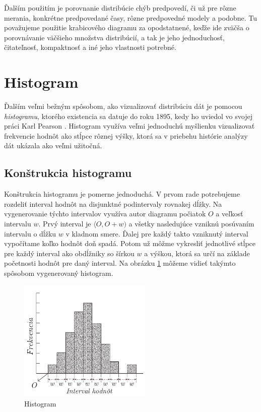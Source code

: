 Ďalším použitím je porovnanie distribúcie chýb predpovedí, či už pre rôzne merania, konkrétne predpovedané časy, rôzne predpovedné modely a podobne. Tu považujeme použitie krabicového diagramu za opodstatnené, keďže ide zväčša o porovnávanie väčšieho množstva distribúcií, a tak je jeho jednoduchosť, čitateľnosť, kompaktnosť a iné jeho vlastnosti potrebné.

\section{Histogram}
\label{sec:histogram}
Ďalším veľmi bežným spôsobom, ako vizualizovať distribúciu dát je pomocou \textit{histogramu}, ktorého existencia sa datuje do roku 1895, kedy ho uviedol vo svojej práci Karl Pearson \cite{histogram}. Histogram využíva veľmi jednoduchú myšlienku vizualizovať frekvencie hodnôt ako stĺpce rôznej výšky, ktorá sa v priebehu histórie analýzy dát ukázala ako veľmi užitočná.

\subsection{Konštrukcia histogramu}
Konštrukcia histogramu je pomerne jednoduchá. V prvom rade potrebujeme rozdeliť interval hodnôt na disjunktné podintervaly rovnakej dĺžky. Na vygenerovanie týchto intervalov využíva autor diagramu počiatok $ O $ a veľkosť intervalu $ w $. Prvý interval je $ \langle O, O + w) $ a všetky nasledujúce vzniknú posúvaním intervalu o dĺžku $ w $ v kladnom smere. Ďalej pre každý takto vzniknutý interval vypočítame koľko hodnôt doň spadá. Potom už môžme vykresliť jednotlivé stĺpce pre každý interval ako obdĺžniky so šírkou $ w $ a výškou, ktorá sa určí na základe početnosti hodnôt pre daný interval. Na obrázku \ref{fig:histogram} môžeme vidieť takýmto spôsobom vygenerovaný histogram.

\begin{figure}
	\centering
	\includegraphics[width = 2.5in]{histogram}
	\caption{ Histogram }
	\label{fig:histogram}
\end{figure}

